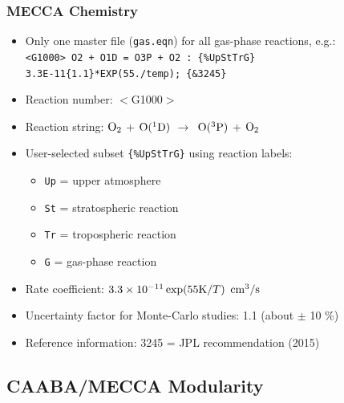 \documentclass[t]{beamer}
\DeclareRobustCommand*{\chem}[1]{\ensuremath{%
\mathcode`-="0200\mathcode`\=="003D%
\mathrm{#1}}}
\DeclareRobustCommand*{\unit}[1]{\ensuremath{%
\def\mu{\mbox{\textmu}}\def~{\,}%
\mathrm{#1}}}
\newcommand{\E}[1]{\mbox{}\ensuremath{\times 10^{#1}}}
\def\TO{\mbox{}\ensuremath{\rightarrow}}
\begin{document}
\begin{frame}[fragile]

  \frametitle{MECCA Chemistry}

  \begin{itemize}[<+-| alert@+>]
  \item Only one master file (\verb|gas.eqn|) for all gas-phase
    reactions, e.g.:\\
    \verb|<G1000> O2 + O1D = O3P + O2 : {%UpStTrG}|\\
    \verb|3.3E-11{|\textsection\verb|1.1}*EXP(55./temp); {&3245}|
  \item Reaction number: $<$G1000$>$
  \item Reaction string: \chem{O_2} + \chem{O(^1D)} \TO\ \chem{O(^3P)} +
    \chem{O_2}
  \item User-selected subset \verb|{%UpStTrG}| using reaction labels:
    \begin{itemize}[<*>]
    \item \verb|Up| = upper atmosphere
    \item \verb|St| = stratospheric reaction
    \item \verb|Tr| = tropospheric reaction
    \item \verb|G| = gas-phase reaction
    \end{itemize}
  \item Rate coefficient: $3.3\E{-11} \exp(55 \unit{K}/T)$ \unit{cm^3/s}
  \item Uncertainty factor for Monte-Carlo studies: 1.1 (about $\pm$ 10 \%)
  \item Reference information: 3245 = JPL recommendation (2015)
  \end{itemize}

\end{frame}


\subsection{CAABA/MECCA Modularity}
\end{document}
